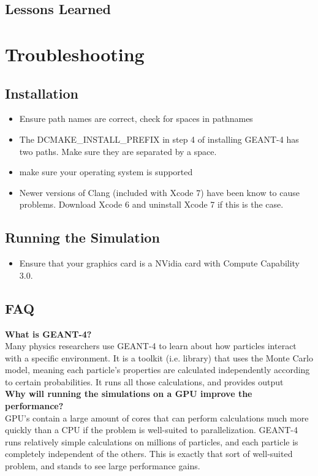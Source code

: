 \documentclass[12pt]{article}
\begin{document}
\subsection{Lessons Learned} %

\section{Troubleshooting} %
\subsection{Installation} %
\begin{itemize}
\item Ensure path names are correct, check for spaces in pathnames
\item The DCMAKE\_INSTALL\_PREFIX in step 4 of installing GEANT-4  has two paths. Make sure they are separated by a space.
\item make sure your operating system is supported 
\item Newer versions of Clang (included with Xcode 7) have been know to cause problems. Download Xcode 6 and uninstall Xcode 7 if this is the case.
\end{itemize}
\subsection{Running the Simulation} %
\begin{itemize}
\item Ensure that your graphics card is a NVidia card with Compute Capability 3.0.
\end{itemize}
\subsection{FAQ} %
\textbf{What is GEANT-4?}\\
Many physics researchers use GEANT-4 to learn about how particles interact with a specific environment. It is a toolkit (i.e. library) that uses the Monte Carlo model, meaning each particle's properties are calculated independently according to certain probabilities. It runs all those calculations, and provides output\\

\textbf{Why will running the simulations on a GPU improve the performance?}\\
GPU's contain a large amount of cores that can perform calculations much more quickly than a CPU if the problem is well-suited to parallelization. GEANT-4 runs relatively simple calculations on millions of particles, and each particle is completely independent of the others. This is exactly that sort of well-suited problem, and stands to see large performance gains.\\
\end{document}
